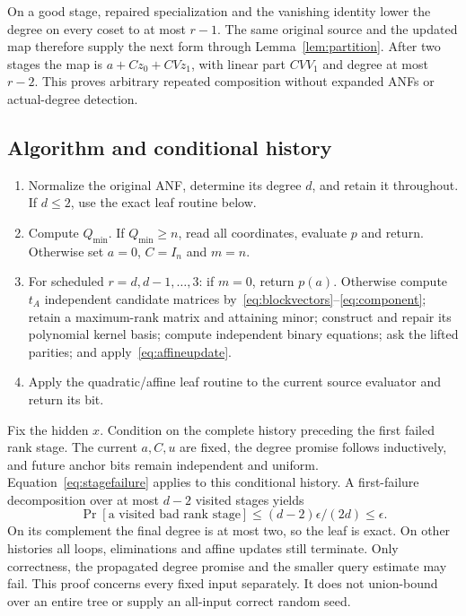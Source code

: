\documentclass[11pt]{article}
\theoremstyle{remark}\newtheorem{remark}[theorem]{Remark}
\begin{document}
On a good stage, repaired specialization and the vanishing identity lower the degree on every coset to at most $r-1$. The same original source and the updated map therefore supply the next form through Lemma~\ref{lem:partition}. After two stages the map is $a+Cz_0+CVz_1$, with linear part $CVV_1$ and degree at most $r-2$. This proves arbitrary repeated composition without expanded ANFs or actual-degree detection.

\subsection{Algorithm and conditional history}
\begin{enumerate}
\item Normalize the original ANF, determine its degree $d$, and retain it throughout. If $d\le2$, use the exact leaf routine below.
\item Compute $Q_{\min}$. If $Q_{\min}\ge n$, read all coordinates, evaluate $p$ and return. Otherwise set $a=0$, $C=I_n$ and $m=n$.
\item For scheduled $r=d,d-1,\ldots,3$: if $m=0$, return $p(a)$. Otherwise compute $t_A$ independent candidate matrices by~\eqref{eq:blockvectors}--\eqref{eq:component}; retain a maximum-rank matrix and attaining minor; construct and repair its polynomial kernel basis; compute independent binary equations; ask the lifted parities; and apply~\eqref{eq:affineupdate}.
\item Apply the quadratic/affine leaf routine to the current source evaluator and return its bit.
\end{enumerate}
Fix the hidden $x$. Condition on the complete history preceding the first failed rank stage. The current $a,C,u$ are fixed, the degree promise follows inductively, and future anchor bits remain independent and uniform. Equation~\eqref{eq:stagefailure} applies to this conditional history. A first-failure decomposition over at most $d-2$ visited stages yields
\begin{equation}\label{eq:totalfailure}
 \Pr[\text{a visited bad rank stage}]
 \le(d-2)\epsilon/(2d)\le\epsilon.
\end{equation}
On its complement the final degree is at most two, so the leaf is exact. On other histories all loops, eliminations and affine updates still terminate. Only correctness, the propagated degree promise and the smaller query estimate may fail. This proof concerns every fixed input separately. It does not union-bound over an entire tree or supply an all-input correct random seed.
\end{document}
